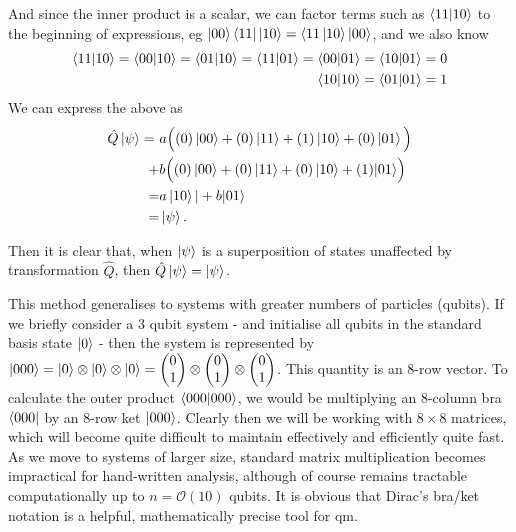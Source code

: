 \begin{example}
    And since the inner product is a scalar, we can factor terms such as $\braket{11|10}$ to the beginning of expressions, eg $ \ket{00} \bra{11} \ket{10} = \langle 11\ket{10} \ket{00}$, and we also know
    \begin{equation}
        \begin{split}
        \braket{11|10} = \braket{00|10} =  \braket{01|10} = \braket{11|01} = \braket{00|01}  = \braket{10|01} = 0 
        \\ \braket{10|10} = \braket{01|01} = 1 
        \end{split}
    \end{equation}
    We can express the above as 
    \begin{equation}
        \begin{split}
            \hat{Q}\ket{\psi} = 
            \ &a \Big((0) \ket{00}  + (0) \ket{11} + (1) \ket{10}  + (0) \ket{01} \Big)
            \\ + &b \Big((0)\ket{00} +(0) \ket{11}+ (0) \ket{10} + (1) |01 \rangle \Big)
            \\ = &a\ket{10}| + b |01 \rangle 
            \\ = &\ket{\psi}.
        \end{split}
    \end{equation}
    
    Then it is clear that, when $\ket{\psi}$ is a superposition of states unaffected by transformation $\hat{Q}$, then $\hat{Q}\ket{\psi} = \ket{\psi} $. 
\end{example}
\par 

This method generalises to systems with greater numbers of particles (qubits). 
If we briefly consider a 3 qubit system - and initialise all qubits in the standard basis state $\ket{0}$ 
- then the system is represented by $|000\rangle = \ket{0} \otimes \ket{0} \otimes \ket{0} = \left(\begin{matrix}0\\1\end{matrix}\right) \otimes \left(\begin{matrix}0\\1\end{matrix}\right) \otimes \left(\begin{matrix}0\\1\end{matrix}\right)$. 
This quantity is an 8-row vector.  To calculate the outer product $\langle 000 | 000 \rangle$, we would be multiplying an 8-column bra $\langle000| $ by an 8-row ket $|000\rangle$. 
Clearly then we will be working with $8 \times 8$ matrices, which will become quite difficult to maintain effectively and efficiently quite fast. 
As we move to systems of larger size, standard matrix multiplication becomes impractical for hand-written analysis, 
    although of course remains tractable computationally up to $n =  \mathcal{O}(10)$ qubits. 
It is obvious that Dirac's bra/ket notation is a helpful, mathematically precise tool for \gls{qm}. 